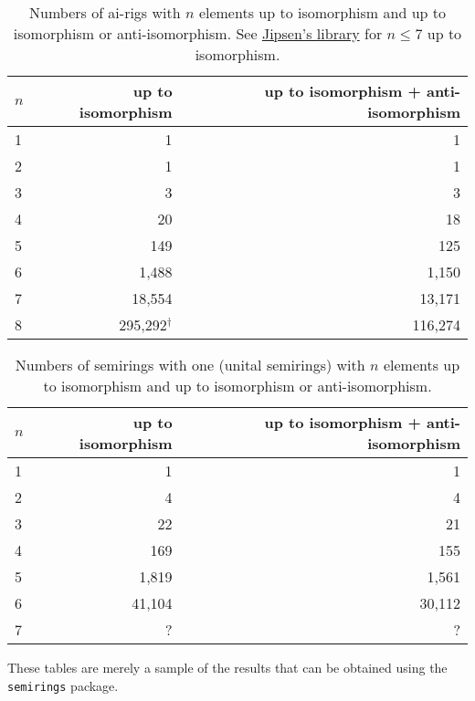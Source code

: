 \documentclass{article}
\theoremstyle{definition}
\theoremstyle{plain}
\begin{document}
\begin{table}[ht]
  \centering
  \begin{tabular}{l|r|r}
    \toprule
    $n$ & up to isomorphism & up to isomorphism + anti-isomorphism \\
    \midrule
    1 & 1         & 1      \\
    2 & 1         & 1      \\
    3 & 3         & 3      \\
    4 & 20        & 18     \\
    5 & 149       & 125    \\
    6 & 1,488     & 1,150  \\
    7 & 18,554    & 13,171 \\
    8 & 295,292$^\dagger$   & 116,274      \\
  \end{tabular}
  \caption{Numbers of ai-rigs with $n$ elements up to isomorphism and up
    to isomorphism or anti-isomorphism. See
    \href{https://math.chapman.edu/~jipsen/structures/doku.php?id=idempotent_semirings_with_identity_and_zero\#finite_members}{Jipsen's
  library} for \(n\leq7\) up to isomorphism.}
  \label{tab:ai-rigs}
\end{table}

\begin{table}[h]
  \centering
  \begin{tabular}{l|r|r}
    \toprule
    $n$ & up to isomorphism & up to isomorphism + anti-isomorphism \\
    \midrule
    1 & 1         & 1      \\
    2 & 4         & 4      \\
    3 & 22        & 21     \\
    4 & 169       & 155    \\
    5 & 1,819     & 1,561  \\
    6 & 41,104    & 30,112 \\
    7 & ?         & ?      \\
  \end{tabular}
  \caption{Numbers of semirings with one (unital semirings) with $n$
  elements up to isomorphism and up to isomorphism or anti-isomorphism.}
  \label{tab:unital-semirings}
\end{table}

These tables are merely a sample of the results that can be obtained
using the \texttt{semirings} package.


\printbibliography
\end{document}
